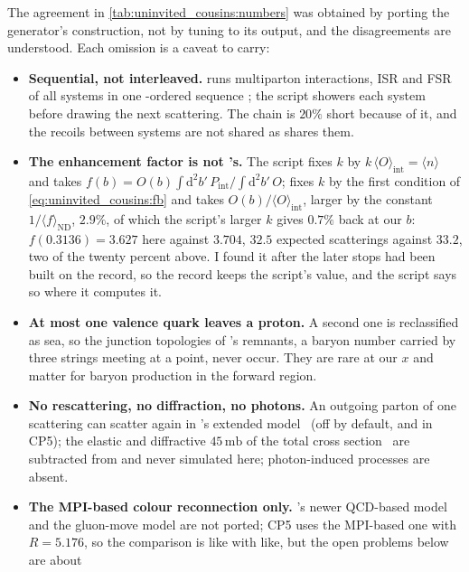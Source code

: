 The agreement in \cref{tab:uninvited_cousins:numbers} was obtained by
porting the generator's construction, not by tuning to its output, and the
disagreements are understood. Each omission is a caveat to carry:
\begin{itemize}
  \item \textbf{Sequential, not interleaved.} \PYTHIA runs multiparton
    interactions, ISR and FSR of all systems in one \pt-ordered sequence
    \cite{Sjostrand:2004ef}; the script showers each system before drawing
    the next scattering. The chain is $20\%$ short because of it, and the
    recoils between systems are not shared as \PYTHIA shares them.
  \item \textbf{The enhancement factor is not \PYTHIA's.} The script fixes
    $k$ by $k\,\langle O\rangle_{\mathrm{int}}=\langle n\rangle$ and takes
    $f(b)=O(b)\int\mathrm{d}^2b'\,P_{\mathrm{int}}/\int\mathrm{d}^2b'\,O$;
    \PYTHIA fixes $k$ by the first condition of
    \cref{eq:uninvited_cousins:fb} and takes
    $O(b)/\langle O\rangle_{\mathrm{int}}$, larger by the constant
    $1/\langle f\rangle_{\mathrm{ND}}$, $2.9\%$, of which the script's
    larger $k$ gives $0.7\%$ back at our $b$: $f(0.3136)=3.627$ here against
    $3.704$, $32.5$ expected scatterings against $33.2$, two of the twenty
    percent above. I found it after the later stops had been built on the
    record, so the record keeps the script's value, and the script says so
    where it computes it.
  \item \textbf{At most one valence quark leaves a proton.} A second one is
    reclassified as sea, so the junction topologies of \PYTHIA's remnants,
    a baryon number carried by three strings meeting at a point, never
    occur. They are rare at our $x$ and matter for baryon production in
    the forward region.
  \item \textbf{No rescattering, no diffraction, no photons.} An outgoing
    parton of one scattering can scatter again in \PYTHIA's extended
    model~\cite{Corke:2009tk} (off by default, and in CP5); the elastic and
    diffractive $45\,\mathrm{mb}$ of the total cross
    section~\cite{Navin:2010kk} are subtracted from \signd and never
    simulated here; photon-induced
    processes are absent.
  \item \textbf{The MPI-based colour reconnection only.} \PYTHIA's newer
    QCD-based model~\cite{Christiansen:2015yqa} and the gluon-move model
    are not ported; CP5 uses the MPI-based one with $R=5.176$, so the
    comparison is like with like, but the open problems below are about

\end{itemize}
